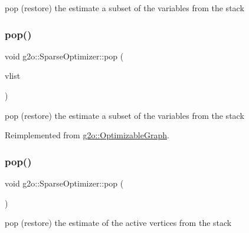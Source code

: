 pop (restore) the estimate a subset of the variables from the stack 

\mbox{\label{classg2o_1_1_sparse_optimizer_aa6688f8636bf89ef919d72947692d59c}} 
\subsubsection{\texorpdfstring{pop()}{pop()}\hspace{0.1cm}{\footnotesize\ttfamily [2/3]}}
{\footnotesize\ttfamily void g2o\+::\+Sparse\+Optimizer\+::pop (\begin{DoxyParamCaption}\item[{\mbox{\hyperlink{classg2o_1_1_hyper_graph_a703938cdb4bb636860eed55a2489d70c}{Hyper\+Graph\+::\+Vertex\+Set}} \&}]{vlist }\end{DoxyParamCaption})\hspace{0.3cm}{\ttfamily [virtual]}}



pop (restore) the estimate a subset of the variables from the stack 



Reimplemented from \mbox{\hyperlink{structg2o_1_1_optimizable_graph_a83425dbe755d22877ba692e93e04a6af}{g2o\+::\+Optimizable\+Graph}}.

\mbox{\label{classg2o_1_1_sparse_optimizer_ad2f7f62ebe17b40e050f0525db64355b}} 
\subsubsection{\texorpdfstring{pop()}{pop()}\hspace{0.1cm}{\footnotesize\ttfamily [3/3]}}
{\footnotesize\ttfamily void g2o\+::\+Sparse\+Optimizer\+::pop (\begin{DoxyParamCaption}{ }\end{DoxyParamCaption})\hspace{0.3cm}{\ttfamily [virtual]}}



pop (restore) the estimate of the active vertices from the stack 



